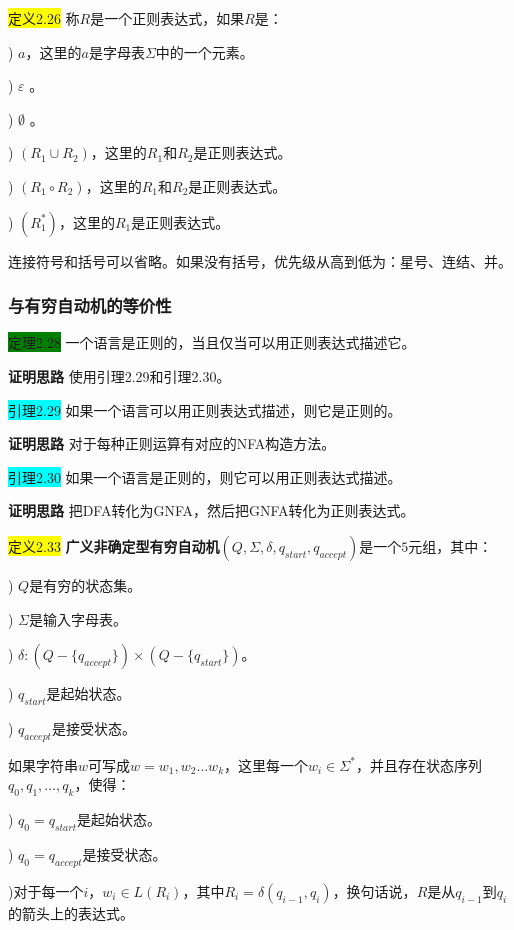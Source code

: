 \documentclass[a4paper]{article}
\begin{document}
	\colorbox{yellow}{定义2.26} 称$R$是一个正则表达式，如果$R$是：
	
	) $a$，这里的$a$是字母表$\Sigma$中的一个元素。
	
	) $\varepsilon$ 。
	
	) $\emptyset$ 。
	
	) $(R_1 \cup R_2)$，这里的$R_1$和$R_2$是正则表达式。
	
	) $(R_1 \circ R_2)$，这里的$R_1$和$R_2$是正则表达式。
	
	) $(R_1^*)$，这里的$R_1$是正则表达式。

	连接符号和括号可以省略。如果没有括号，优先级从高到低为：星号、连结、并。
	
\subsubsection{与有穷自动机的等价性}

	\colorbox{green}{定理2.28} 一个语言是正则的，当且仅当可以用正则表达式描述它。
	
	\textbf{证明思路} \quad 使用引理2.29和引理2.30。
	
	\colorbox{cyan}{引理2.29} 如果一个语言可以用正则表达式描述，则它是正则的。
	
	\textbf{证明思路} \quad 对于每种正则运算有对应的NFA构造方法。
	
	\colorbox{cyan}{引理2.30} 如果一个语言是正则的，则它可以用正则表达式描述。
	
	\textbf{证明思路} \quad 把DFA转化为GNFA，然后把GNFA转化为正则表达式。
	
	\colorbox{yellow}{定义2.33} \textbf{广义非确定型有穷自动机}$(Q,\Sigma,\delta,q_{start},q_{accept})$是一个$5$元组，其中：
	
	) $Q$是有穷的状态集。

	) $\Sigma$是输入字母表。
	
	) $\delta:(Q-\{q_{accept}\})\times(Q-\{q_{start}\})$。
	
	) $q_{start}$是起始状态。
	
	) $q_{accept}$是接受状态。
	
	如果字符串$w$可写成$w=w_1,w_2 \dots w_k$，这里每一个$w_i \in \Sigma^*$，并且存在状态序列$q_0,q_1,\dots,q_k$，使得：
	
	) $q_0=q_{start}$是起始状态。
	
	) $q_0=q_{accept}$是接受状态。
	
	)对于每一个$i$，$w_i \in L(R_i)$，其中$R_i=\delta(q_{i-1},q_i)$，换句话说，$R$是从$q_{i-1}$到$q_i$的箭头上的表达式。
	
\end{document}
